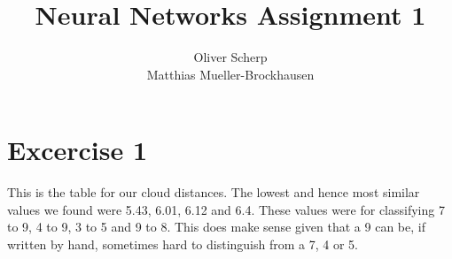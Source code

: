 \documentclass{article}
\begin{document}
\title{Neural Networks Assignment 1}
\author{Oliver Scherp\\Matthias Mueller-Brockhausen}
\maketitle
\lstset{
  basicstyle=\ttfamily,
  keywordstyle=\bfseries,
  language=Java,
  frame=single,
  aboveskip=11pt,
  belowskip=11pt,
  breaklines=true,
  breakatwhitespace=false,
  showspaces=false,
  showstringspaces=false,
  numbers=left,
  stepnumber=1,    
  firstnumber=1,
  numberfirstline=true
}
\section{Excercise 1}
This is the table for our cloud distances.
The lowest and hence most similar values we found were 5.43, 6.01, 6.12 and 6.4.
These values were for classifying 7 to 9, 4 to 9, 3 to 5 and 9 to 8.
This does make sense given that a 9 can be, if written by hand, sometimes hard to distinguish from a 7, 4 or 5.
\end{document}
